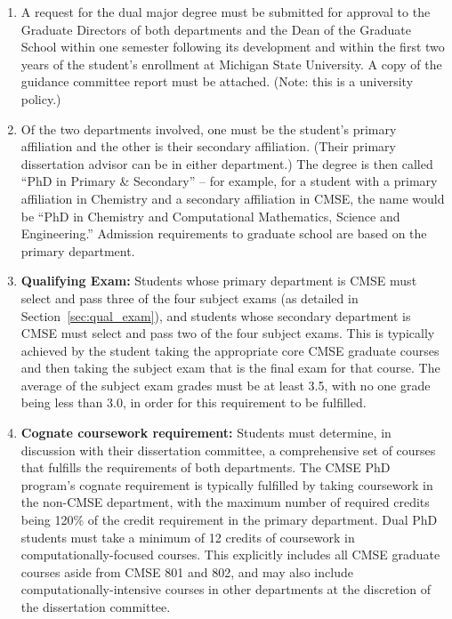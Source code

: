 \begin{enumerate}

\item  A request for the dual major degree must be submitted for
  approval to the Graduate Directors of both departments and the Dean
  of the Graduate School within one semester following its development
  and within the first two years of the student’s enrollment at
  Michigan State University.  A copy of the guidance committee report
  must be attached.  (Note: this is a university policy.)

\item Of the two departments involved, one must be the student's
  primary affiliation and the other is their secondary affiliation.
  (Their primary dissertation advisor can be in either department.)  The
  degree is then called ``PhD in Primary \& Secondary'' -- for
  example, for a student with a primary affiliation in Chemistry and a
  secondary affiliation in CMSE, the name would be ``PhD in Chemistry
  and Computational Mathematics, Science and Engineering.'' Admission
  requirements to graduate school are based on the primary department.

\item \textbf{Qualifying Exam:} Students whose primary department is
  CMSE must select and pass three of the four subject exams (as
  detailed in Section~\ref{sec:qual_exam}), and students whose
  secondary department is CMSE must select and pass two of the four
  subject exams.  This is typically achieved by the student taking the
  appropriate core CMSE graduate courses and then taking the subject
  exam that is the final exam for that course.  The average of the
  subject exam grades must be at least 3.5, with no one grade being
  less than 3.0, in order for this requirement to be fulfilled. 

\item \textbf{Cognate coursework requirement:}  Students must
  determine, in discussion with their dissertation committee, a
  comprehensive set of courses that fulfills the requirements of both
  departments.  The CMSE PhD program's cognate requirement is
  typically fulfilled by taking coursework in the non-CMSE department,
  with the maximum number of required credits being 120\% of the
  credit requirement in the primary department.  Dual PhD students
  must take a minimum of 12 credits of coursework in
  computationally-focused courses.  This explicitly includes all CMSE
  graduate courses aside from CMSE 801 and 802, and may also include
  computationally-intensive courses in other departments at the
  discretion of the dissertation committee.


\end{enumerate}
